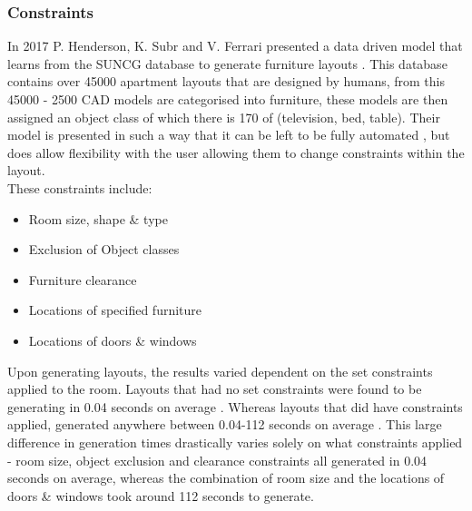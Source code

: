 \subsubsection*{Constraints}
In 2017 P. Henderson, K. Subr and V. Ferrari presented a data driven model that learns from the SUNCG \cite{suncg} database to generate furniture layouts \cite{constrained-layouts}. This database contains over 45000 apartment layouts that are designed by humans, from this 45000 - 2500 CAD models are categorised into furniture, these models are then assigned an object class of which there is 170 of (television, bed, table).
Their model is presented in such a way that it can be left to be fully automated \cite{constrained-layouts}, but does allow flexibility with the user allowing them to change constraints within the layout.\\
These constraints include:
\begin{itemize}
    \item Room size, shape \& type 
    \item Exclusion of Object classes
    \item Furniture clearance 
    \item Locations of specified furniture
    \item Locations of doors \& windows
\end{itemize}
Upon generating layouts, the results varied dependent on the set constraints applied to the room. Layouts that had no set constraints were found to be generating in 0.04 seconds on average \cite{constrained-layouts}. Whereas layouts that did have constraints applied, generated anywhere between 0.04-112 seconds on average \cite{constrained-layouts}. This large difference in generation times drastically varies solely on what constraints applied -  room size, object exclusion and clearance constraints all generated in 0.04 seconds on average, whereas the combination of room size and the locations of doors \& windows took around 112 seconds to generate.

